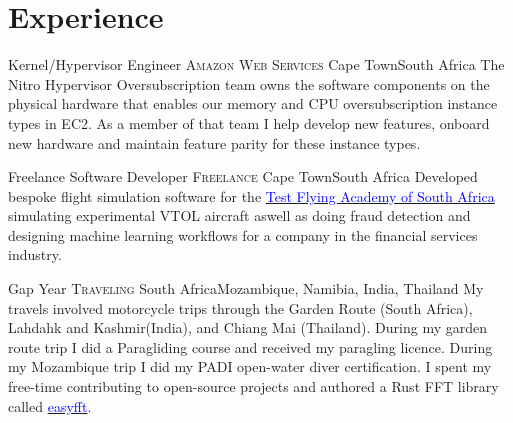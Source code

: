 \documentclass[10pt,a4paper,sans]{moderncv}
\begin{document}


\section{Experience}

{Kernel/Hypervisor Engineer}
{\textsc{Amazon Web Services}}
{\newline Cape Town}{South Africa}
{The Nitro Hypervisor Oversubscription team owns the software components on the
physical hardware that enables our memory and CPU oversubscription instance
types in EC2. As a member of that team I help develop new features, onboard new
hardware and maintain feature parity for these instance types.}

\cventry{2023\newline}
{Freelance Software Developer}
{\textsc{Freelance}}
{\newline Cape Town}{South Africa}
{Developed bespoke flight simulation software for the
\href{https://www.tfasa.com/}{\textcolor{blue}{Test Flying Academy of South
Africa}} simulating experimental VTOL aircraft aswell as doing fraud detection
and designing machine learning workflows for a company in the financial services
industry.}

\cventry{ 2022\newline }
{Gap Year}
{\textsc{Traveling}}
{\newline South Africa}{Mozambique, Namibia, India, Thailand}
{My travels involved motorcycle trips through the Garden Route (South Africa),
Lahdahk and Kashmir(India), and Chiang Mai (Thailand). During my garden route
trip I did a Paragliding course and received my paragling licence. During my
Mozambique trip I did my PADI open-water diver certification. I spent my
free-time contributing to open-source projects and authored a Rust FFT library
called
\href{https://docs.rs/easyfft/latest/easyfft/}{\textcolor{blue}{easyfft}}.}
\end{document}
